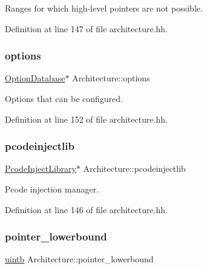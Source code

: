 Ranges for which high-\/level pointers are not possible. 



Definition at line 147 of file architecture.\+hh.

\mbox{\label{class_architecture_ab581a0109bda8e9206bb155a80a3a694}} 
\subsubsection{\texorpdfstring{options}{options}}
{\footnotesize\ttfamily \mbox{\hyperlink{class_option_database}{Option\+Database}}$\ast$ Architecture\+::options}



Options that can be configured. 



Definition at line 152 of file architecture.\+hh.

\mbox{\label{class_architecture_a7d04d77ca75b9e75caa3750c156d9bbf}} 
\subsubsection{\texorpdfstring{pcodeinjectlib}{pcodeinjectlib}}
{\footnotesize\ttfamily \mbox{\hyperlink{class_pcode_inject_library}{Pcode\+Inject\+Library}}$\ast$ Architecture\+::pcodeinjectlib}



Pcode injection manager. 



Definition at line 146 of file architecture.\+hh.

\mbox{\label{class_architecture_aa6544ee69038548a7f09157beb38e8d4}} 
\subsubsection{\texorpdfstring{pointer\_lowerbound}{pointer\_lowerbound}}
{\footnotesize\ttfamily \mbox{\hyperlink{types_8h_a2db313c5d32a12b01d26ac9b3bca178f}{uintb}} Architecture\+::pointer\+\_\+lowerbound}



